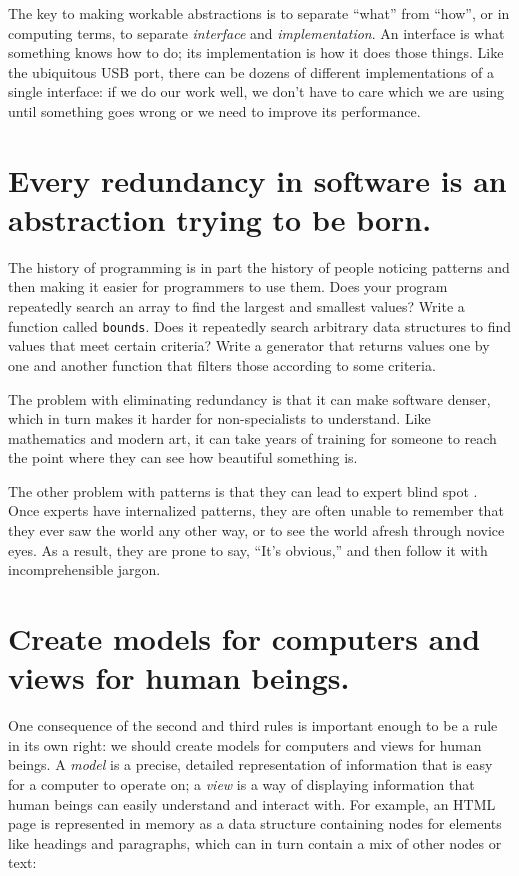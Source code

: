 \documentclass[10pt,letterpaper]{article}
\newcommand{\rulemajor}[1]{\section{#1}}
\begin{document}
The key to making workable abstractions is to separate ``what'' from ``how'', or
in computing terms, to separate \emph{interface} and \emph{implementation}.  An
interface is what something knows how to do; its implementation is how it does
those things.  Like the ubiquitous USB port, there can be dozens of different
implementations of a single interface: if we do our work well, we don't have to
care which we are using until something goes wrong or we need to improve its
performance.

\rulemajor{Every redundancy in software is an abstraction trying to be born.}

The history of programming is in part the history of people noticing patterns
and then making it easier for programmers to use them.  Does your program
repeatedly search an array to find the largest and smallest values?  Write a
function called \texttt{bounds}.  Does it repeatedly search arbitrary data
structures to find values that meet certain criteria?  Write a generator that
returns values one by one and another function that filters those according to
some criteria.

The problem with eliminating redundancy is that it can make software denser,
which in turn makes it harder for non-specialists to understand.  Like
mathematics and modern art, it can take years of training for someone to reach
the point where they can see how beautiful something is.

The other problem with patterns is that they can lead to expert blind spot
\cite{Nath2003}.  Once experts have internalized patterns, they are often unable
to remember that they ever saw the world any other way, or to see the world
afresh through novice eyes.  As a result, they are prone to say, ``It's
obvious,'' and then follow it with incomprehensible jargon.

\rulemajor{Create models for computers and views for human beings.}

One consequence of the second and third rules is important enough to be a rule
in its own right: we should create models for computers and views for human
beings.  A \emph{model} is a precise, detailed representation of information
that is easy for a computer to operate on; a \emph{view} is a way of displaying
information that human beings can easily understand and interact with.  For
example, an HTML page is represented in memory as a data structure containing
nodes for elements like headings and paragraphs, which can in turn contain a mix
of other nodes or text:
\end{document}
